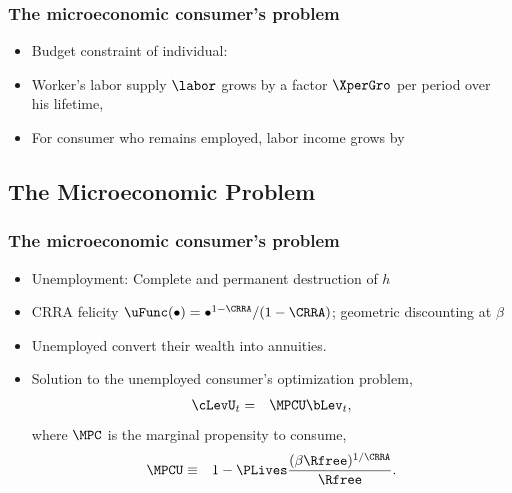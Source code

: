 \documentclass{beamer}
\begin{document}
\begin{frame}
\frametitle{The microeconomic consumer's problem}
    \begin{itemize}
    \item Budget constraint of individual:

    \item Worker's labor supply $\labor$ grows by a factor $\XperGro$ per period over his lifetime,

    \item For consumer who remains employed, labor income grows by 

    \end{itemize}
\end{frame}

\subsection{The Microeconomic Problem}
\begin{frame}
\frametitle{The microeconomic consumer's problem}
    \begin{itemize}
    \item Unemployment: Complete and permanent destruction of $h$

    \item CRRA felicity $\uFunc(\bullet)=
\bullet^{1-\CRRA}/(1-\CRRA)$; geometric discounting at $\beta$ 

    \item Unemployed convert their wealth into annuities.

    \item Solution to the unemployed consumer's optimization problem,
\begin{eqnarray*}
\cLevU_{t} & = & \MPCU \bLev_t,
\end{eqnarray*}
where $\MPC$ is the marginal propensity to consume,
\begin{eqnarray*}
\MPCU & \equiv & 1- \PLives\frac{(\beta \Rfree)^{1/\CRRA}}{\Rfree}.
\end{eqnarray*}

    
    \end{itemize}

\end{frame}
\end{document}

